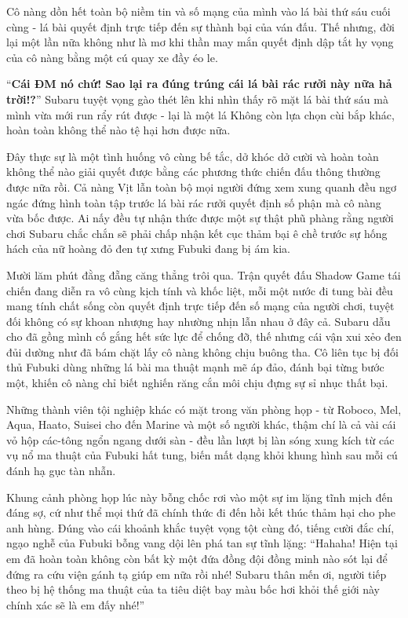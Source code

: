 \documentclass[../main.tex]{subfiles}
\begin{document}
Cô nàng dồn hết toàn bộ niềm tin và số mạng của mình vào lá bài thứ sáu cuối cùng - lá bài quyết định trực tiếp đến sự thành bại của ván đấu. Thế nhưng, đời lại một lần nữa không như là mơ khi thần may mắn quyết định dập tắt hy vọng của cô nàng bằng một cú quay xe đầy éo le.

``\textbf{Cái ĐM nó chứ! Sao lại ra đúng trúng cái lá bài rác rưởi này nữa hả trời!?}'' Subaru tuyệt vọng gào thét lên khi nhìn thấy rõ mặt lá bài thứ sáu mà mình vừa mới run rẩy rút được - lại là một lá Không còn lựa chọn cùi bắp khác, hoàn toàn không thể nào tệ hại hơn được nữa.

Đây thực sự là một tình huống vô cùng bế tắc, dở khóc dở cười và hoàn toàn không thể nào giải quyết được bằng các phương thức chiến đấu thông thường được nữa rồi. Cả nàng Vịt lẫn toàn bộ mọi người đứng xem xung quanh đều ngơ ngác đứng hình toàn tập trước lá bài rác rưởi quyết định số phận mà cô nàng vừa bốc được. Ai nấy đều tự nhận thức được một sự thật phũ phàng rằng người chơi Subaru chắc chắn sẽ phải chấp nhận kết cục thảm bại ê chề trước sự hống hách của nữ hoàng đỏ đen tự xưng Fubuki đang bị ám kia.

\ct

Mười lăm phút đằng đẵng căng thẳng trôi qua. Trận quyết đấu Shadow Game tái chiến đang diễn ra vô cùng kịch tính và khốc liệt, mỗi một nước đi tung bài đều mang tính chất sống còn quyết định trực tiếp đến số mạng của người chơi, tuyệt đối không có sự khoan nhượng hay nhường nhịn lẫn nhau ở đây cả. Subaru dẫu cho đã gồng mình cố gắng hết sức lực để chống đỡ, thế nhưng cái vận xui xẻo đen đủi dường như đã bám chặt lấy cô nàng không chịu buông tha. Cô liên tục bị đối thủ Fubuki dùng những lá bài ma thuật mạnh mẽ áp đảo, đánh bại từng bước một, khiến cô nàng chỉ biết nghiến răng cắn môi chịu đựng sự sỉ nhục thất bại.

Những thành viên tội nghiệp khác có mặt trong văn phòng họp - từ Roboco, Mel, Aqua, Haato, Suisei cho đến Marine và một số người khác, thậm chí là cả vài cái vỏ hộp các-tông ngổn ngang dưới sàn - đều lần lượt bị làn sóng xung kích từ các vụ nổ ma thuật của Fubuki hất tung, biến mất dạng khỏi khung hình sau mỗi cú đánh hạ gục tàn nhẫn.

Khung cảnh phòng họp lúc này bỗng chốc rơi vào một sự im lặng tĩnh mịch đến đáng sợ, cứ như thể mọi thứ đã chính thức đi đến hồi kết thúc thảm hại cho phe anh hùng. Đúng vào cái khoảnh khắc tuyệt vọng tột cùng đó, tiếng cười đắc chí, ngạo nghễ của Fubuki bỗng vang dội lên phá tan sự tĩnh lặng: ``Hahaha! Hiện tại em đã hoàn toàn không còn bất kỳ một đứa đồng đội đồng minh nào sót lại để đứng ra cứu viện gánh tạ giúp em nữa rồi nhé! Subaru thân mến ơi, người tiếp theo bị hệ thống ma thuật của ta tiêu diệt bay màu bốc hơi khỏi thế giới này chính xác sẽ là em đấy nhé!''
\end{document}
